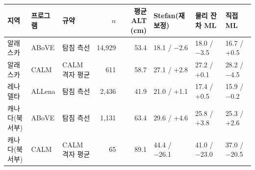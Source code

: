 \begin{tabular}{@{}lllrrlll@{}}
\toprule
지역 & 프로그램 & 규약 & $n$ & 평균 ALT (cm) & Stefan(재보정) & 물리 잔차 ML & 직접 ML \\
\midrule
알래스카 & ABoVE & 탐침 측선 & 14,929 & 53.4 & 18.1 / −2.6 & 18.0 / −3.5 & 16.7 / +0.5 \\
알래스카 & CALM & CALM 격자 평균 & 611 & 58.7 & 27.1 / +2.8 & 27.2 / +0.1 & 28.2 / −4.5 \\
레나 델타 & ALLena & 탐침 측선 & 2,436 & 41.9 & 21.0 / +1.1 & 17.4 / +0.5 & 15.9 / −0.2 \\
캐나다(북서부) & ABoVE & 탐침 측선 & 1,131 & 63.4 & 29.6 / +4.6 & 25.8 / +3.8 & 25.3 / +2.6 \\
캐나다(북서부) & CALM & CALM 격자 평균 & 65 & 89.1 & 44.4 / −26.1 & 41.0 / −23.0 & 37.0 / −20.5 \\
\bottomrule
\end{tabular}

